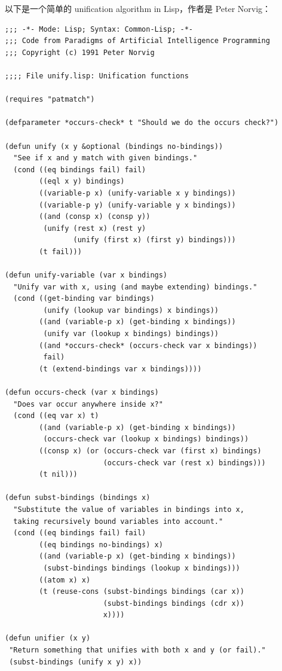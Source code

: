 \documentclass[12pt, orivec]{article}
\begin{document}
以下是一个简单的 unification algorithm in Lisp，作者是 Peter Norvig： 
\begin{tcolorbox}[breakable]
\footnotesize
\ttfamily
\begin{verbatim}
;;; -*- Mode: Lisp; Syntax: Common-Lisp; -*-
;;; Code from Paradigms of Artificial Intelligence Programming
;;; Copyright (c) 1991 Peter Norvig

;;;; File unify.lisp: Unification functions

(requires "patmatch")

(defparameter *occurs-check* t "Should we do the occurs check?")

(defun unify (x y &optional (bindings no-bindings))
  "See if x and y match with given bindings."
  (cond ((eq bindings fail) fail)
        ((eql x y) bindings)
        ((variable-p x) (unify-variable x y bindings))
        ((variable-p y) (unify-variable y x bindings))
        ((and (consp x) (consp y))
         (unify (rest x) (rest y) 
                (unify (first x) (first y) bindings)))
        (t fail)))

(defun unify-variable (var x bindings)
  "Unify var with x, using (and maybe extending) bindings."
  (cond ((get-binding var bindings)
         (unify (lookup var bindings) x bindings))
        ((and (variable-p x) (get-binding x bindings))
         (unify var (lookup x bindings) bindings))
        ((and *occurs-check* (occurs-check var x bindings))
         fail)
        (t (extend-bindings var x bindings))))

(defun occurs-check (var x bindings)
  "Does var occur anywhere inside x?"
  (cond ((eq var x) t)
        ((and (variable-p x) (get-binding x bindings))
         (occurs-check var (lookup x bindings) bindings))
        ((consp x) (or (occurs-check var (first x) bindings)
                       (occurs-check var (rest x) bindings)))
        (t nil)))

(defun subst-bindings (bindings x)
  "Substitute the value of variables in bindings into x,
  taking recursively bound variables into account."
  (cond ((eq bindings fail) fail)
        ((eq bindings no-bindings) x)
        ((and (variable-p x) (get-binding x bindings))
         (subst-bindings bindings (lookup x bindings)))
        ((atom x) x)
        (t (reuse-cons (subst-bindings bindings (car x))
                       (subst-bindings bindings (cdr x))
                       x))))

(defun unifier (x y)
 "Return something that unifies with both x and y (or fail)."
 (subst-bindings (unify x y) x))
\end{verbatim}
\normalsize
\rmfamily
\end{tcolorbox}
\end{document}

